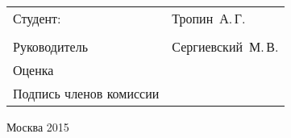 \begin{titlepage}
\begin{center}
    \begin{tabular}{ p{}p{} }

      Студент: & Тропин~А.\,Г.\\
      \vfill & \vfill\\
      Руководитель & Сергиевский~М.\,В.\\
      \vfill
      Оценка\\
      \vfill
      Подпись членов комиссии
      & \\
    \end{tabular}
    \vfill
    {\normalsize Москва 2015}
  \end{center}
\end{titlepage}


